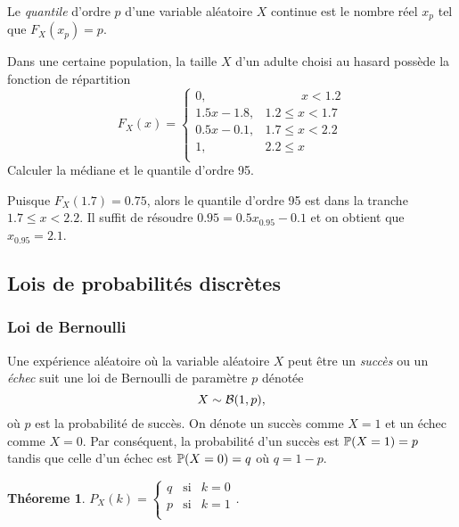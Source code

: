 \documentclass[11pt]{article}
\renewcommand\P{%
	\ensuremath{%
		\mathbb{P}%
	}%
}%
\newcommand\bin{%
	\ensuremath{%
		\mathcal{B}%
	}%
}%
\newtheorem{theoreme}{Théoreme}[section]
\begin{document}
\begin{definition}
	Le \textit{quantile} d'ordre $p$ d'une variable aléatoire $X$ continue est
	le nombre réel $x_p$ tel que $F_X(x_p)=p$.
\end{definition}

\begin{exemple}
	Dans une certaine population, la taille $X$ d'un adulte choisi au hasard
	possède la fonction de répartition 
	\begin{equation*}
		F_X(x)=\left\{
			\begin{matrix}
				0,        & \phantom{1.2\leq\;}x<1.2\\
				1.5x-1.8, & 1.2\leq x<1.7\\
				0.5x-0.1, & 1.7\leq x<2.2\\
				1,        & 2.2\leq x\phantom{<2.2\;}\\
			\end{matrix}
		\right.
	\end{equation*}
	Calculer la médiane et le quantile d'ordre 95.

	Puisque $F_X(1.7)=0.75$, alors le quantile d'ordre 95 est dans la tranche
	$1.7\leq x<2.2$. Il suffit de résoudre $0.95=0.5x_{0.95}-0.1$ et on obtient
	que $x_{0.95}=2.1$.
\end{exemple}

\subsection{Lois de probabilités discrètes}
\subsubsection{Loi de Bernoulli}
Une expérience aléatoire où la variable aléatoire $X$ peut être un
\textit{succès} ou un \textit{échec} suit une loi de Bernoulli de paramètre
$p$ dénotée
\begin{equation*}
	X\sim\bin(1,p),
\end{equation*}
où $p$ est la probabilité de succès. On dénote un succès comme $X=1$ et un
échec comme $X=0$. Par conséquent, la probabilité d'un succès est $\P(X=1)=p$
tandis que celle d'un échec est $\P(X=0)=q$ où $q=1-p$.

\begin{theoreme}
	$P_X(k)=\left\{
		\begin{matrix}
			q &\text{si} & k=0\\
			p &\text{si} & k=1\\		
		\end{matrix}
	\right.$.
\end{theoreme}
\end{document}
